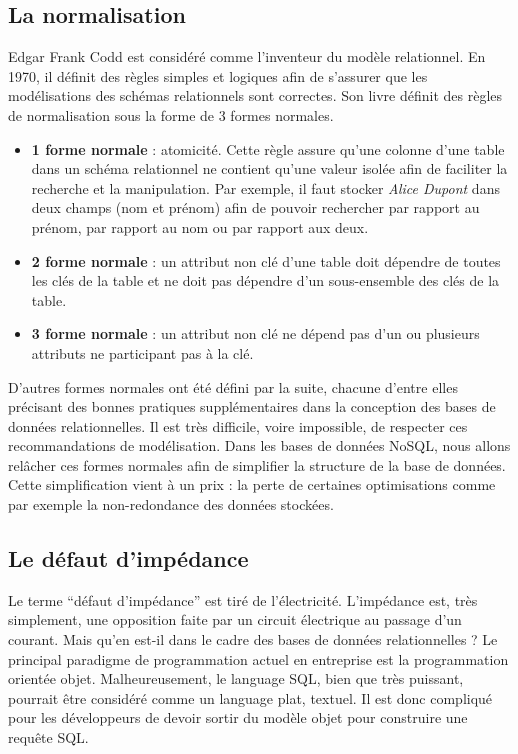 \subsection{La normalisation}

    Edgar Frank Codd est considéré comme l'inventeur du modèle relationnel. En 1970, il définit des règles simples et logiques afin de s'assurer que les modélisations des schémas relationnels sont correctes\cite{Wikipedia_Edgar_Frank_Codd}. Son livre définit des règles de normalisation sous la forme de 3 formes normales.
    \vspace{10px}
    \begin{itemize}
      \item \textbf{1\iere{} forme normale} : atomicité. Cette règle assure qu'une colonne d'une table dans un schéma relationnel ne contient qu'une valeur isolée afin de faciliter la recherche et la manipulation. Par exemple, il faut stocker \textit{Alice Dupont} dans deux champs (nom et prénom) afin de pouvoir rechercher par rapport au prénom, par rapport au nom ou par rapport aux deux.
      \item \textbf{2\ieme{} forme normale} : un attribut non clé d'une table doit dépendre de toutes les clés de la table et ne doit pas dépendre d'un sous-ensemble des clés de la table.
      \item \textbf{3\ieme{} forme normale} : un attribut non clé ne dépend pas d'un ou plusieurs attributs ne participant pas à la clé.
    \end{itemize}
    \vspace{20px}
    D'autres formes normales ont été défini par la suite, chacune d'entre elles précisant des bonnes pratiques supplémentaires dans la conception des bases de données relationnelles. Il est très difficile, voire impossible, de respecter ces recommandations de modélisation. Dans les bases de données NoSQL, nous allons relâcher ces formes normales afin de simplifier la structure de la base de données. Cette simplification vient à un prix : la perte de certaines optimisations comme par exemple la non-redondance des données stockées.

\subsection{Le défaut d'impédance}

  Le terme \enquote{défaut d'impédance} est tiré de l'électricité. L'impédance est, très simplement, une opposition faite par un circuit électrique au passage d'un courant. Mais qu'en est-il dans le cadre des bases de données relationnelles ? Le principal paradigme de programmation actuel en entreprise est la programmation orientée objet. Malheureusement, le language SQL, bien que très puissant, pourrait être considéré comme un language plat, textuel. Il est donc compliqué pour les développeurs de devoir sortir du modèle objet pour construire une requête SQL.\\

